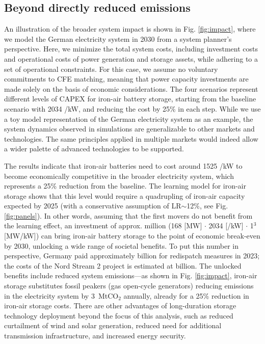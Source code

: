 \documentclass[pdflatex,sn-basic, Numbered]{sn-jnl}
\theoremstyle{thmstyleone}%
\theoremstyle{thmstyletwo}%
\theoremstyle{thmstylethree}%
\begin{document}
\subsection*{Beyond directly reduced emissions}\label{sec4}

An illustration of the broader system impact is shown in Fig. \ref{fig:impact}, where we model the German electricity system in 2030 from a system planner's perspective. Here, we minimize the total system costs, including investment costs and operational costs of power generation and storage assets, while adhering to a set of operational constraints. For this case, we assume no voluntary commitments to CFE matching, meaning that power capacity investments are made solely on the basis of economic considerations. The four scenarios represent different levels of CAPEX for iron-air battery storage, starting from the baseline scenario with 2034 \officialeuro/kW, and reducing the cost by 25\% in each step. While we use a toy model representation of the German electricity system as an example, the system dynamics observed in simulations are generalizable to other markets and technologies. The same principles applied in multiple markets would indeed allow a wider palette of advanced technologies to be supported.

The results indicate that iron-air batteries need to cost around 1525 \officialeuro/kW to become economically competitive in the broader electricity system, which represents a 25\% reduction from the baseline. The learning model for iron-air storage shows that this level would require a quadrupling of iron-air capacity expected by 2025 (with a conservative assumption of LR$\sim$12\%, see Fig. \ref{fig:panels}). In other words, assuming that the first movers do not benefit from the learning effect, an investment of approx.  million (168 [MW] $\cdot$ 2034 [\officialeuro/kW] $\cdot$ 1$^3$ [MW/kW]) can bring iron-air battery storage to the point of economic break-even by 2030, unlocking a wide range of societal benefits. To put this number in perspective, Germany paid approximately  billion for redispatch measures in 2023; the  costs of the Nord Stream 2 project is estimated at  billion. The unlocked benefits include reduced system emissions---as shown in Fig. \ref{fig:impact}, iron-air storage substitutes fossil peakers (gas open-cycle generators) reducing emissions in the electricity system by 3~MtCO$_2$ annually, already for a 25\% reduction in iron-air storage costs. There are other advantages of long-duration storage technology deployment beyond the focus of this analysis, such as reduced curtailment of wind and solar generation, reduced need for additional transmission infrastructure, and increased energy security.
\end{document}
